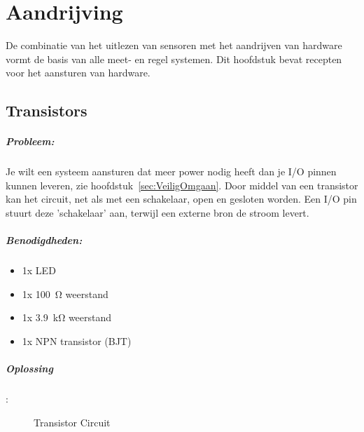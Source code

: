 \chapter{Aandrijving}
De combinatie van het uitlezen van sensoren met het aandrijven van hardware vormt de basis van alle meet- en regel systemen. Dit hoofdstuk bevat recepten voor het aansturen van hardware.

\section{Transistors}
\paragraph{Probleem:}
Je wilt een systeem aansturen dat meer power nodig heeft dan je I/O pinnen kunnen leveren, zie hoofdstuk~\ref{sec:VeiligOmgaan}. Door middel van een transistor kan het circuit, net als met een schakelaar, open en gesloten worden. Een I/O pin stuurt deze 'schakelaar' aan, terwijl een externe bron de stroom levert.

\paragraph{Benodigdheden:}
\begin{itemize}
	\item 1x LED
	\item 1x \SI{100}{\ohm} weerstand
	\item 1x \SI{3.9}{\kilo\ohm} weerstand
	\item 1x NPN transistor (BJT)
\end{itemize}

\paragraph{Oplossing}: 

	\begin{figure}
		\caption{Transistor Circuit}
		\label{fig:TransistorLED}
	\end{figure}

